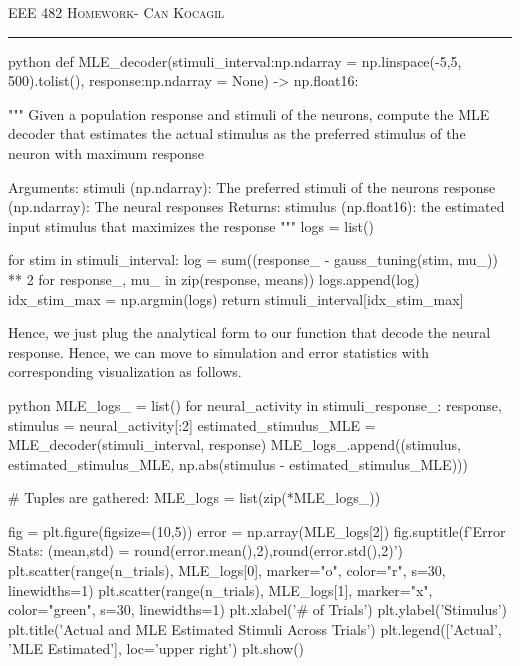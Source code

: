 \documentclass[12pt]{amsart}
\begin{document}
\newpage
{\scshape EEE 482} \hfill {\scshape \large  Homework-\relax} \hfill {\scshape Can Kocagil}
\smallskip
\hrule
\vspace{2mm}

\begin{mintedbox}{python}
def MLE_decoder(stimuli_interval:np.ndarray = np.linspace(-5,5, 500).tolist(),
                response:np.ndarray = None) -> np.float16:
     
    """
    Given a population response and  stimuli of the
    neurons, compute the MLE decoder that 
    estimates the actual stimulus as the preferred
    stimulus of the neuron with maximum response

        Arguments:
            stimuli  (np.ndarray): The preferred stimuli of the neurons
            response (np.ndarray): The neural responses
        Returns:
            stimulus (np.float16): the estimated input stimulus that maximizes the response
    """
    logs = list()

    for stim in stimuli_interval:
        log = sum((response_ - gauss_tuning(stim, mu_)) ** 2 for response_, mu_ in zip(response, means)) 
        logs.append(log)
    idx_stim_max = np.argmin(logs)
    return stimuli_interval[idx_stim_max]
\end{mintedbox}


Hence, we just plug the analytical form to our function that decode the neural response. Hence, we can move to simulation and error statistics with corresponding visualization as follows.


\begin{mintedbox}{python}
MLE_logs_ = list()
for neural_activity in stimuli_response_:
    response, stimulus = neural_activity[:2]
    estimated_stimulus_MLE = MLE_decoder(stimuli_interval, response)
    MLE_logs_.append((stimulus, estimated_stimulus_MLE, np.abs(stimulus - estimated_stimulus_MLE)))
            
# Tuples are gathered:
MLE_logs = list(zip(*MLE_logs_))

fig = plt.figure(figsize=(10,5))
error = np.array(MLE_logs[2])
fig.suptitle(f'Error Stats: (mean,std) = {round(error.mean(),2),round(error.std(),2)}')
plt.scatter(range(n_trials), MLE_logs[0], marker="o", color="r", s=30, linewidths=1)
plt.scatter(range(n_trials), MLE_logs[1], marker="x", color="green", s=30, linewidths=1)
plt.xlabel('# of Trials')
plt.ylabel('Stimulus')
plt.title('Actual and MLE Estimated Stimuli Across Trials')
plt.legend(['Actual', 'MLE Estimated'], loc='upper right')
plt.show()
\end{mintedbox}
\end{document}
